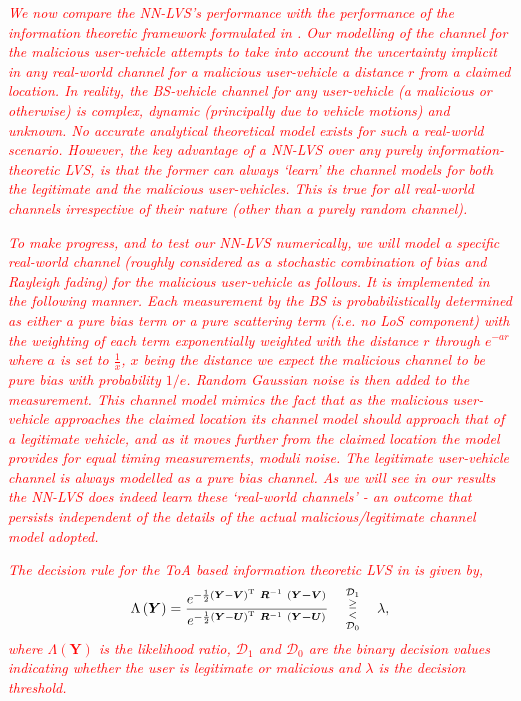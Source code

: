\documentclass[journal]{IEEEtran}
\newcommand{\Honull}{\mathcal{{D}}_0}
\newcommand{\Hoalt}{\mathcal{{D}}_1}
\begin{document}
\textcolor{red}{\textit{We now compare the NN-LVS's performance with the performance of the information theoretic framework formulated in \cite{Ausctw}. Our modelling of the channel for the malicious user-vehicle attempts to take into account the uncertainty implicit in any real-world channel for a malicious user-vehicle a distance $r$ from a claimed location. In reality, the  BS-vehicle channel for any user-vehicle (a malicious or otherwise) is complex, dynamic (principally due to vehicle motions) and unknown. No accurate  analytical theoretical model exists for such a real-world scenario. However, the key advantage of a NN-LVS over any purely information-theoretic LVS, is that the former can always `learn' the channel models for both the legitimate and the malicious user-vehicles. This is true for all real-world channels irrespective of their nature (other than a purely random channel).}}

\textcolor{red}{\textit{To make progress, and to test our NN-LVS numerically, we will model a specific real-world channel (roughly considered as a stochastic combination of bias and Rayleigh fading) for the malicious user-vehicle as follows. It is implemented in the following manner. Each measurement by the BS is probabilistically determined as either a pure bias term or a  pure scattering term (i.e. no LoS component) with the weighting of each term exponentially weighted with the distance $r$ through $e^{-ar}$ where $a$ is set to $\frac{1}{x}$, $x$ being the distance we expect the malicious channel to be  pure bias with probability $1/e$. Random Gaussian  noise is then added to the measurement. This channel model mimics the fact that as the malicious user-vehicle approaches the claimed location its channel model should approach that of a legitimate vehicle, and as it moves further from the claimed location the model  provides for equal timing measurements, moduli noise. The legitimate user-vehicle channel is always modelled as a pure bias channel. As we will see in our results the NN-LVS does indeed learn these `real-world channels' - an outcome that persists independent of the details of the  actual malicious/legitimate channel model adopted.}}

\textcolor{red}{\textit{The decision rule for the ToA based information theoretic LVS in \cite{Ausctw} is given by,}}
\begin{align} \label{LRT20}
\Lambda \left(\boldsymbol{Y}\right)=\frac{e^{\mathrm{-}\frac{1}{2}{\left(\boldsymbol{Y}-\boldsymbol{V}\right)}^{\mathrm{T}}\boldsymbol{\ }{\boldsymbol{R}}^{-1}\boldsymbol{\ }\left(\boldsymbol{Y}\boldsymbol{-}\boldsymbol{V}\right)}}{e^{\mathrm{-}\frac{1}{2}{\left(\boldsymbol{Y}-\boldsymbol{U}\right)}^{\mathrm{T}}\boldsymbol{\ }{\boldsymbol{R}}^{-1}\boldsymbol{\ }\left(\boldsymbol{Y}\boldsymbol{-}\boldsymbol{U}\right)}}\ \ \ \genfrac{}{}{0pt}{}{\genfrac{}{}{0pt}{}{\Hoalt}{\ge }}{\genfrac{}{}{0pt}{}{<}{\Honull}}\ \ \ \lambda,
\end{align}
\textcolor{red}{\textit{where $\Lambda \left(\boldsymbol{Y}\right)$ is the likelihood ratio, $\Hoalt$ and $\Honull$ are the binary decision values indicating whether the user is legitimate or malicious and $\lambda$ is the decision threshold.}}
\end{document}
